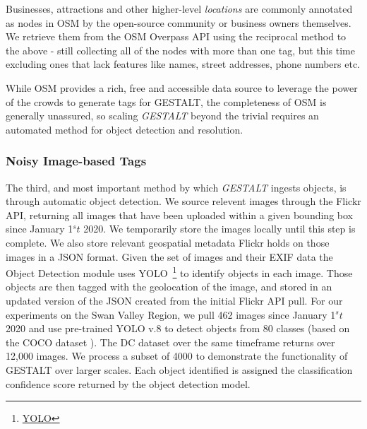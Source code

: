 
Businesses, attractions and other higher-level \textit{locations} are commonly annotated as nodes in OSM by the open-source community or business owners themselves. 
We retrieve them from the OSM Overpass API using the reciprocal method to the above - still collecting all of the nodes with more than one tag, but this time excluding ones that lack features like names, street addresses, phone numbers etc. 


While OSM provides a rich, free and accessible data source to leverage the power of the crowds to generate tags for GESTALT, the completeness of OSM is generally unassured, so scaling \textit{GESTALT} beyond the trivial requires an automated method for object detection and resolution. 




\subsubsection{Noisy Image-based Tags}
The third, and most important method by which \emph{GESTALT} ingests objects, is through automatic object detection.
We source relevent images through the Flickr API, returning all images that have been uploaded within a given bounding box since January 1$^st$ 2020. We temporarily store the images locally until this step is complete. 
We also store relevant geospatial metadata Flickr holds on those images in a JSON format. 
Given the set of images and their EXIF data the Object Detection module uses YOLO~\footnote{\href{https://github.com/ultralytics/ultralytics}{YOLO}} to identify objects in each image. 
Those objects are then tagged with the geolocation of the image, and stored in an updated version of the JSON created from the initial Flickr API pull. 
For our experiments on the Swan Valley Region, we pull 462 images since January 1$^st$ 2020 and use pre-trained YOLO v.8 to detect objects from 80 classes (based on the COCO dataset ). 
The DC dataset over the same timeframe returns over 12,000 images. We process a subset of 4000 to demonstrate the functionality of GESTALT over larger scales. 
Each object identified is assigned the classification confidence score returned by the object detection model. 



